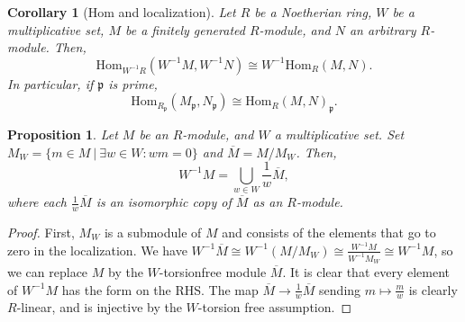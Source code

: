\documentclass{amsart}[12pt]
\newcommand{\Hom}{\mathrm{Hom}}
\newcommand{\p}{{\mathfrak p}}
\numberwithin{equation}{section}
\theoremstyle{plain} %
\newtheorem{corollary}[equation]{Corollary}
\newtheorem{proposition}[equation]{Proposition}
\theoremstyle{definition}
\theoremstyle{remark}
\begin{document}
\begin{corollary}[Hom and localization]
	Let $R$ be a Noetherian ring, $W$ be a multiplicative set, $M$ be a finitely generated $R$-module, and $N$ an arbitrary $R$-module. Then,
	\[ \Hom_{W^{-1}R}(W^{-1}M , W^{-1}N) \cong W^{-1} \Hom_R(M,N). \]
	In particular, if $\p$ is prime,
	\[ \Hom_{R_{\p}}(M_{\p} , N_{\p}) \cong \Hom_R(M,N)_{\p}. \]
\end{corollary}

\begin{proposition}
	Let $M$ be an $R$-module, and $W$ a multiplicative set. Set $M_W=\{ m\in M \ | \ \exists w\in W : wm=0\}$ and $\overline{M}=M/M_W$. Then,
	\[ W^{-1} M = \bigcup_{w\in W} \frac{1}{w} \overline{M}, \]
	where each $\frac{1}{w} \overline{M}$ is an isomorphic copy of $\overline{M}$ as an $R$-module.
\end{proposition}
\begin{proof}
	First, $M_W$ is a submodule of $M$ and consists of the elements that go to zero in the localization. We have $W^{-1}{\overline{M}} \cong W^{-1}(M/M_W) \cong \frac{W^{-1}M}{W^{-1} M_W}\cong W^{-1}M$, so we can replace $M$ by the $W$-torsionfree module $\overline{M}$. It is clear that every element of $W^{-1}M$ has the form on the RHS. The map $\overline{M} \to \frac{1}{w} \overline{M}$ sending $m \mapsto \frac{m}{w}$ is clearly $R$-linear, and is injective by the $W$-torsion free assumption.
\end{proof}
\end{document}
